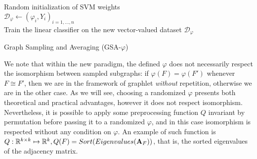 \begin{algorithm}[H]\label{alg:GSA}
\DontPrintSemicolon
  \\
  \\
  \Algo{\\}
  Random initialization of SVM weights\\
  $\mathcal{D}_{\varphi}\gets (\varphi_i,Y_i)_{i=1,\ldots, n}$\\
  Train the linear classifier on the new vector-valued dataset $\mathcal{D}_{\varphi}$
\caption{Graph Sampling and Averaging (GSA-$\varphi$)}
\end{algorithm}

We note that within the new paradigm, the defined $\varphi$ does not necessarily respect the isomorphism between sampled subgraphs: if $\varphi(F) = \varphi(F')$ whenever $F \cong F'$, then we are in the framework of graphlet \emph{without} repetition, otherwise we are in the other case. As we will see, choosing a randomized $\varphi$ presents both theoretical and practical advantages, however it does not respect isomorphism. Nevertheless, it is possible to apply some preprocessing function $Q$ invariant by permutation before passing it to a randomized $\varphi$, and in this case isomorphism is respected without any condition on $\varphi$. An example of such function is $Q:\mathbb{R}^{k\times k}\mapsto \mathbb{R}^k, Q(F)=Sort(Eigenvalues(\mathbf{A}_F))$, that is, the sorted eigenvalues of the adjacency matrix.



